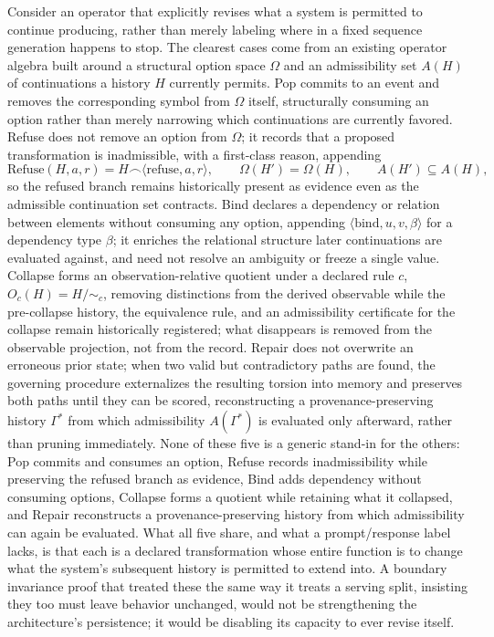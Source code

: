 \documentclass[11pt]{article}
\begin{document}
Consider an operator that explicitly revises what a system is permitted to continue producing, rather than merely labeling where in a fixed sequence generation happens to stop. The clearest cases come from an existing operator algebra built around a structural option space $\Omega$ and an admissibility set $A(H)$ of continuations a history $H$ currently permits. Pop commits to an event and removes the corresponding symbol from $\Omega$ itself, structurally consuming an option rather than merely narrowing which continuations are currently favored. Refuse does not remove an option from $\Omega$; it records that a proposed transformation is inadmissible, with a first-class reason, appending
\[
\mathrm{Refuse}(H,a,r) = H \frown \langle \mathrm{refuse}, a, r\rangle,
\qquad
\Omega(H') = \Omega(H),
\qquad
A(H') \subseteq A(H),
\]
so the refused branch remains historically present as evidence even as the admissible continuation set contracts. Bind declares a dependency or relation between elements without consuming any option, appending $\langle \mathrm{bind}, u, v, \beta\rangle$ for a dependency type $\beta$; it enriches the relational structure later continuations are evaluated against, and need not resolve an ambiguity or freeze a single value. Collapse forms an observation-relative quotient under a declared rule $c$, $O_c(H) = H/{\sim_c}$, removing distinctions from the derived observable while the pre-collapse history, the equivalence rule, and an admissibility certificate for the collapse remain historically registered; what disappears is removed from the observable projection, not from the record. Repair does not overwrite an erroneous prior state; when two valid but contradictory paths are found, the governing procedure externalizes the resulting torsion into memory and preserves both paths until they can be scored, reconstructing a provenance-preserving history $\Gamma^\ast$ from which admissibility $A(\Gamma^\ast)$ is evaluated only afterward, rather than pruning immediately. None of these five is a generic stand-in for the others: Pop commits and consumes an option, Refuse records inadmissibility while preserving the refused branch as evidence, Bind adds dependency without consuming options, Collapse forms a quotient while retaining what it collapsed, and Repair reconstructs a provenance-preserving history from which admissibility can again be evaluated. What all five share, and what a prompt/response label lacks, is that each is a declared transformation whose entire function is to change what the system's subsequent history is permitted to extend into. A boundary invariance proof that treated these the same way it treats a serving split, insisting they too must leave behavior unchanged, would not be strengthening the architecture's persistence; it would be disabling its capacity to ever revise itself.
\end{document}
